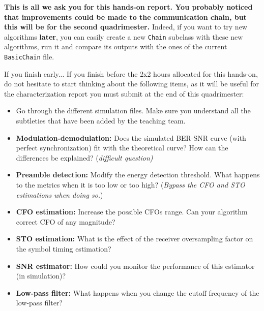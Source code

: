 \textbf{This is all we ask you for this hands-on report. You probably noticed that improvements could be made to the communication chain, but this will be for the second quadrimester.} Indeed, if you want to try new algorithms \textbf{later}, you can easily create a new \texttt{Chain} subclass with these new algorithms, run it and compare its outputs with the ones of the current \texttt{BasicChain} file.


\begin{bclogo}[couleur = gray!20, arrondi = 0.2, logo=\bcinfo]{If you finish early...}
If you finish before the 2x2 hours allocated for this hands-on, do not hesitate to start thinking about the following items, as it will be useful for the characterization report you must submit at the end of this quadrimester:
\begin{itemize}
    \item Go through the different simulation files. Make sure you understand all the subtleties that have been added by the teaching team.
    \item \textbf{Modulation-demodulation:} Does the simulated BER-SNR curve (with perfect synchronization) fit with the theoretical curve? How can the differences be explained? (\textit{difficult question)}
    \item \textbf{Preamble detection:} Modify the energy detection threshold. What happens to the metrics when it is too low or too high? (\textit{Bypass the CFO and STO estimations when doing so.})
    \item \textbf{CFO estimation:} Increase the possible CFOs range. Can your algorithm correct CFO of any magnitude?
    \item \textbf{STO estimation:} What is the effect of the receiver oversampling factor on the symbol timing estimation?
    \item \textbf{SNR estimator:} How could you monitor the performance of this estimator (in simulation)?
    \item \textbf{Low-pass filter:} What happens when you change the cutoff frequency of the low-pass filter?
\end{itemize}
\end{bclogo}



